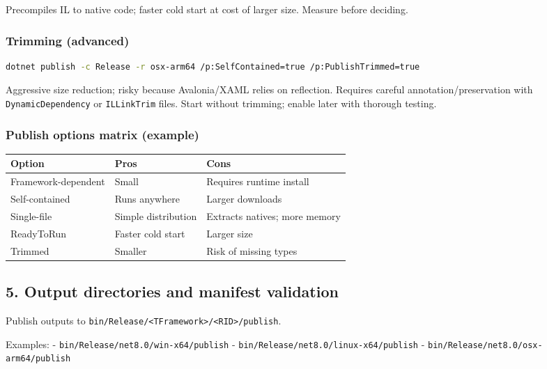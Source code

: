 Precompiles IL to native code; faster cold start at cost of larger size.
Measure before deciding.

\subsubsection{Trimming (advanced)}\label{trimming-advanced}

\begin{lstlisting}[language=bash]
dotnet publish -c Release -r osx-arm64 /p:SelfContained=true /p:PublishTrimmed=true
\end{lstlisting}

Aggressive size reduction; risky because Avalonia/XAML relies on
reflection. Requires careful annotation/preservation with
\passthrough{\lstinline!DynamicDependency!} or
\passthrough{\lstinline!ILLinkTrim!} files. Start without trimming;
enable later with thorough testing.

\subsubsection{Publish options matrix
(example)}\label{publish-options-matrix-example}

\begin{longtable}[]{@{}lll@{}}
\toprule\noalign{}
Option & Pros & Cons \\
\midrule\noalign{}
\endhead
\bottomrule\noalign{}
\endlastfoot
Framework-dependent & Small & Requires runtime install \\
Self-contained & Runs anywhere & Larger downloads \\
Single-file & Simple distribution & Extracts natives; more memory \\
ReadyToRun & Faster cold start & Larger size \\
Trimmed & Smaller & Risk of missing types \\
\end{longtable}

\subsection{5. Output directories and manifest
validation}\label{output-directories-and-manifest-validation}

Publish outputs to
\passthrough{\lstinline!bin/Release/<TFramework>/<RID>/publish!}.

Examples: - \passthrough{\lstinline!bin/Release/net8.0/win-x64/publish!}
- \passthrough{\lstinline!bin/Release/net8.0/linux-x64/publish!} -
\passthrough{\lstinline!bin/Release/net8.0/osx-arm64/publish!}

